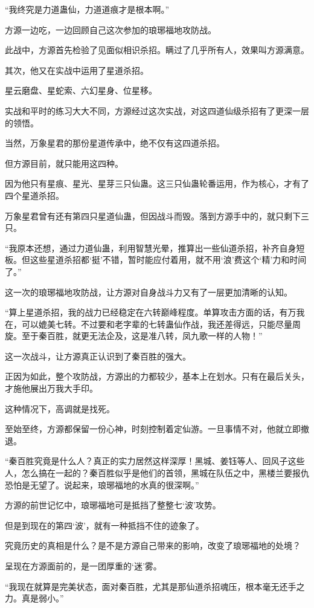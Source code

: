 \begin{this_body}
“我终究是力道蛊仙，力道道痕才是根本啊。”

方源一边吃，一边回顾自己这次参加的琅琊福地攻防战。

此战中，方源首先检验了见面似相识杀招。瞒过了几乎所有人，效果叫方源满意。

其次，他又在实战中运用了星道杀招。

星云磨盘、星蛇索、六幻星身、位星移。

实战和平时的练习大大不同，方源经过这次实战，对这四道仙级杀招有了更深一层的领悟。

当然，万象星君的那份星道传承中，绝不仅有这四道杀招。

但方源目前，就只能用这四种。

因为他只有星痕、星光、星芽三只仙蛊。这三只仙蛊轮番运用，作为核心，才有了四个星道杀招。

万象星君曾有还有第四只星道仙蛊，但因战斗而毁。落到方源手中的，就只剩下三只。

“我原本还想，通过力道仙蛊，利用智慧光晕，推算出一些仙道杀招，补齐自身短板。但这些星道杀招都‘挺’不错，暂时能应付着用，就不用‘浪’费这个‘精’力和时间了。”

这一次的琅琊福地攻防战，让方源对自身战斗力又有了一层更加清晰的认知。

“算上星道杀招，我的战力已经稳定在六转巅峰程度。单算攻击方面的话，有万我在，可以媲美七转。不过要和老字辈的七转蛊仙作战，我还差得远，只能尽量周旋。至于秦百胜，就更无法企及，这是准八转，凤九歌一样的人物！”

这一次战斗，让方源真正认识到了秦百胜的强大。

正因为如此，整个攻防战，方源出的力都较少，基本上在划水。只有在最后关头，才施他展出万我大手印。

这种情况下，高调就是找死。

至始至终，方源都保留一份心神，时刻控制着定仙游。一旦事情不对，他就立即撤退。

“秦百胜究竟是什么人？真正的实力居然这样深厚！黑城、姜钰等人、回风子这些人，怎么搞在一起的？秦百胜似乎是他们的首领，黑城在队伍之中，黑楼兰要报仇恐怕是无望了。说起来，琅琊福地的水真的很深啊。”

方源的前世记忆中，琅琊福地可是抵挡了整整七‘波’攻势。

但是到现在的第四‘波’，就有一种抵挡不住的迹象了。

究竟历史的真相是什么？是不是方源自己带来的影响，改变了琅琊福地的处境？

呈现在方源面前的，是一团厚重的‘迷’雾。

“我现在就算是完美状态，面对秦百胜，尤其是那仙道杀招魂压，根本毫无还手之力。真是弱小。”


\end{this_body}
